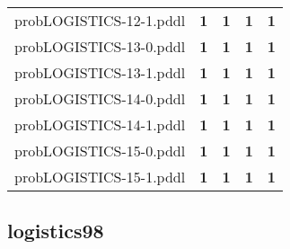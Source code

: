 \documentclass{article}
\begin{document}
\begin{tabular}{@{}lrrrr@{}}
probLOGISTICS-12-1.pddl & \textbf{1} & \textbf{1} & \textbf{1} & \textbf{1} \\
probLOGISTICS-13-0.pddl & \textbf{1} & \textbf{1} & \textbf{1} & \textbf{1} \\
probLOGISTICS-13-1.pddl & \textbf{1} & \textbf{1} & \textbf{1} & \textbf{1} \\
probLOGISTICS-14-0.pddl & \textbf{1} & \textbf{1} & \textbf{1} & \textbf{1} \\
probLOGISTICS-14-1.pddl & \textbf{1} & \textbf{1} & \textbf{1} & \textbf{1} \\
probLOGISTICS-15-0.pddl & \textbf{1} & \textbf{1} & \textbf{1} & \textbf{1} \\
probLOGISTICS-15-1.pddl & \textbf{1} & \textbf{1} & \textbf{1} & \textbf{1} \\
\end{tabular}

\hypertarget{coverage-logistics98}{}
\subsection*{logistics98}
\end{document}

